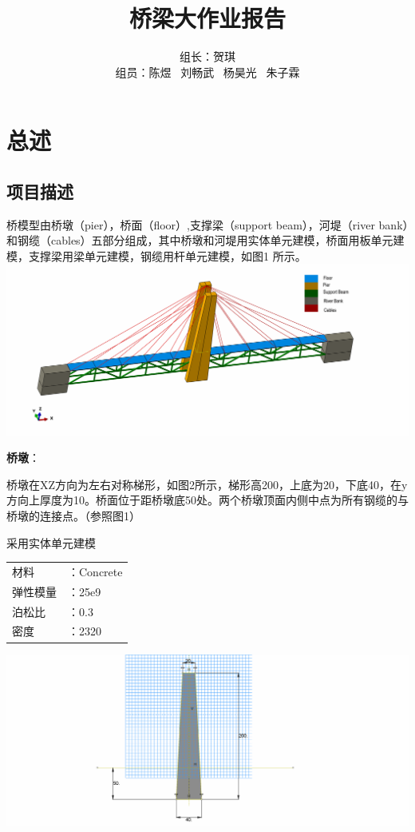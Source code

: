 \documentclass[UTF8]{ctexbook}
\title{桥梁大作业报告}
\author{组长：贺琪 \\ 组员：陈煜 \ 刘畅武 \ 杨昊光 \ 朱子霖}
\begin{document}
\maketitle 

\tableofcontents

\newpage
\section{总述}
\subsection{项目描述}
桥模型由桥墩（pier），桥面（floor）,支撑梁（support beam），河堤（river bank）和钢缆（cables）五部分组成，其中桥墩和河堤用实体单元建模，桥面用板单元建模，支撑梁用梁单元建模，钢缆用杆单元建模，如图1 所示。\\

\includegraphics[width=\textwidth]{01.png} %

\textbf{桥墩}：

桥墩在XZ方向为左右对称梯形，如图2所示，梯形高200，上底为20，下底40，在y方向上厚度为10。桥面位于距桥墩底50处。两个桥墩顶面内侧中点为所有钢缆的与桥墩的连接点。（参照图1）

采用实体单元建模

\begin{center}
\begin{tabular}{ll}
材料&：Concrete\\
弹性模量&：25e9\\
泊松比&：0.3\\
密度&：2320\\
\end{tabular}
\end{center}


\includegraphics[width=\textwidth]{02.png}
\end{document}
